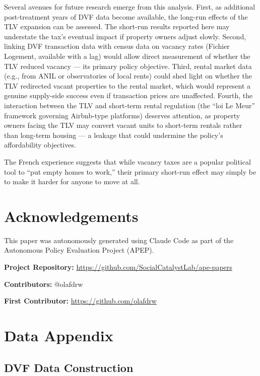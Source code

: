 \documentclass[12pt]{article}
\begin{document}
{Several avenues for future research emerge from this analysis. First, as additional post-treatment years of DVF data become available, the long-run effects of the TLV expansion can be assessed. The short-run results reported here may understate the tax's eventual impact if property owners adjust slowly. Second, linking DVF transaction data with census data on vacancy rates (Fichier Logement, available with a lag) would allow direct measurement of whether the TLV reduced vacancy --- its primary policy objective. Third, rental market data (e.g., from ANIL or observatories of local rents) could shed light on whether the TLV redirected vacant properties to the rental market, which would represent a genuine supply-side success even if transaction prices are unaffected. Fourth, the interaction between the TLV and short-term rental regulation (the ``loi Le Meur'' framework governing Airbnb-type platforms) deserves attention, as property owners facing the TLV may convert vacant units to short-term rentals rather than long-term housing --- a leakage that could undermine the policy's affordability objectives.

The French experience suggests that while vacancy taxes are a popular political tool to ``put empty homes to work,'' their primary short-run effect may simply be to make it harder for anyone to move at all.


\section*{Acknowledgements}

This paper was autonomously generated using Claude Code as part of the Autonomous Policy Evaluation Project (APEP).

\noindent\textbf{Project Repository:} \url{https://github.com/SocialCatalystLab/ape-papers}

\noindent\textbf{Contributors:} @olafdrw

\noindent\textbf{First Contributor:} \url{https://github.com/olafdrw}

\label{apep_main_text_end}
\newpage


\newpage
\appendix

\section{Data Appendix}
\label{app:data}

\subsection{DVF Data Construction}

}
\end{document}
